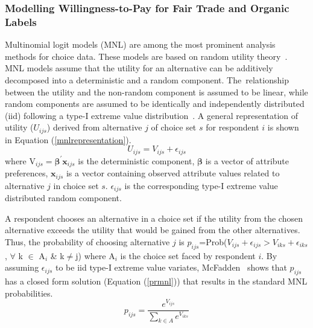 \documentclass[sustainability,article,accept,moreauthors,pdftex,10pt,a4paper]{Definitions/mdpi}
\theoremstyle{mdpi}
\newcounter{ex}
\newcounter{re}
\theoremstyle{mdpidefinition}
\begin{document}
{\subsubsection{Modelling Willingness-to-Pay for Fair Trade and Organic Labels}
\par{Multinomial logit models (MNL) are among the most prominent analysis methods for choice data. These models are based on random utility theory~\cite{McFadden1974,Hanley1998}. MNL models assume that the utility for an alternative can be additively decomposed into a deterministic and a random component. The~relationship between the utility and the non-random component is assumed to be linear, while random components are assumed to be identically and independently distributed (iid) following a type-I extreme value distribution~\cite{Train2009}. A general representation of utility ($U_{ijs}$) derived from alternative $j$ of choice set $s$ for respondent $i$ is shown in Equation (\ref{mnlrepresentation}).
\begin{equation}\label{mnlrepresentation}
U_{ijs} = V_{ijs} + \epsilon_{ijs}
\end{equation}
where V$_{ijs}=\boldsymbol{\beta}^\prime \mathbf{x}_{ijs}$ is the deterministic component, $\boldsymbol{\beta}$ is a vector of attribute preferences, $\mathbf{x}_{ijs}$ is a vector containing observed attribute values related to alternative $j$ in choice set $s$. $\epsilon_{ijs} $ is the corresponding type-I extreme value distributed random component.}
\par{A respondent chooses an alternative in a choice set if the utility from the chosen alternative exceeds the utility that would be gained from the other alternatives. Thus, the probability of choosing alternative $j$ is $p_{ijs}$=Prob($V_{ijs} + \epsilon_{ijs}>V_{iks} + \epsilon_{iks}$, $\forall $ k $\in$ A$_i$ \& k$\ne$j) where A$_i$ is the choice set faced by respondent $i$. By assuming $\epsilon_{ijs}$ to be iid type-I extreme value variates, McFadden~\cite{McFadden1974} shows that $p_{ijs}$ has a closed form solution (Equation (\ref{prmnl})) that results in the standard MNL probabilities.
\begin{equation}\label{prmnl}
p_{ijs} = \frac{e^{V_{ijs}}}{\sum\limits_{k\in A} e^{V_{iks}}}
\end{equation}

}}
\end{document}
